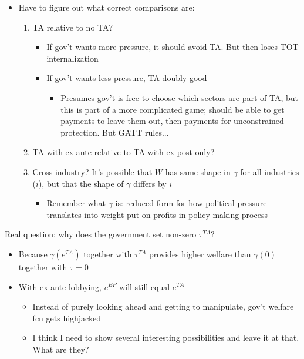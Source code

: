\documentclass[12pt]{article}
\newcommand{\ga}{\gamma}
\begin{document}
\begin{itemize}
\begin{itemize}
		\end{itemize}
	\item Have to figure out what correct comparisons are:
		\begin{enumerate}
			\item TA relative to no TA?
				\begin{itemize}
					\item If gov't wants more pressure, it should avoid TA. But then loses TOT internalization
					\item If gov't wants less pressure, TA doubly good
						\begin{itemize}
							\item Presumes gov't is free to choose which sectors are part of TA, but this is part of a more complicated game; should be able to get payments to leave them out, then payments for unconstrained protection. But GATT rules...
						\end{itemize}
				\end{itemize}
			\item TA with ex-ante relative to TA with ex-post only?
			\item Cross industry? It's possible that $W$ has same shape in $\ga$ for all industries ($i$), but that the shape of $\ga$ differs by $i$
				\begin{itemize}
					\item Remember what $\ga$ is: reduced form for how political pressure translates into weight put on profits in policy-making process
				\end{itemize}
		\end{enumerate}
\end{itemize}

\vskip1in
Real question: why does the government set non-zero $\tau^{TA}$?
\begin{itemize}
	\item Because $\ga(e^{TA})$ together with $\tau^{TA}$ provides higher welfare than $\ga(0)$ together with $\tau=0$
	\item With ex-ante lobbying, $e^{EP}$ will still equal $e^{TA}$
		\begin{itemize}
			\item Instead of purely looking ahead and getting to manipulate, gov't welfare fcn gets highjacked
			\item I think I need to show several interesting possibilities and leave it at that. What are they?
		\end{itemize}
\end{itemize}
\end{document}
